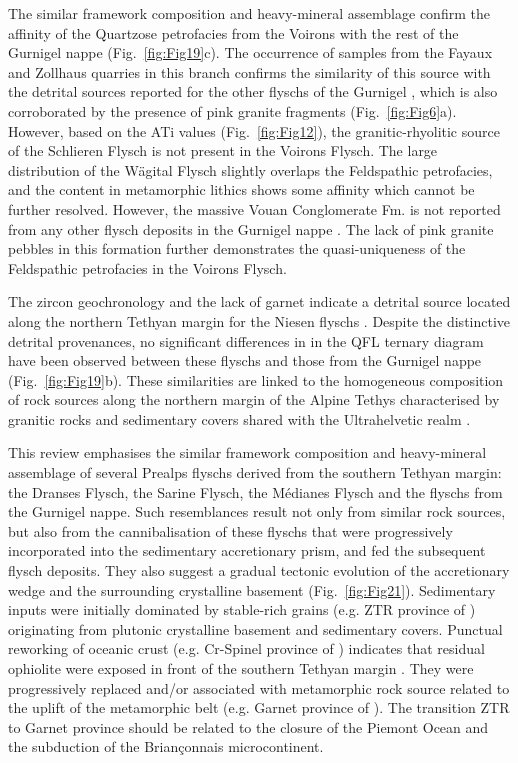 \documentclass[twoside]{article}
\begin{document}
The similar framework composition and heavy-mineral assemblage confirm the affinity of the Quartzose petrofacies from the Voirons with the rest of the Gurnigel nappe (Fig.~\ref{fig:Fig19}c). The occurrence of samples from the Fayaux and Zollhaus quarries in this branch confirms the similarity of this source with the detrital sources reported for the other flyschs of the Gurnigel \citep{Winkler1983,Winkler1984,Caron1989}, which is also corroborated by the presence of pink granite fragments (Fig.~\ref{fig:Fig6}a). However, based on the ATi values (Fig.~\ref{fig:Fig12}), the granitic-rhyolitic source of the Schlieren Flysch \citep{Butler2011} is not present in the Voirons Flysch. The large distribution of the Wägital Flysch slightly overlaps the Feldspathic petrofacies, and the content in metamorphic lithics shows some affinity which cannot be further resolved. However, the massive Vouan Conglomerate Fm. is not reported from any other flysch deposits in the Gurnigel nappe \citep{Caron1989}. The lack of pink granite pebbles in this formation further demonstrates the quasi-uniqueness of the Feldspathic petrofacies in the Voirons Flysch.\par
\medskip
The zircon geochronology \citep{Beltran-Trivino2013} and the lack of garnet \citep{Wildi1985,Bernoulli1990,Argnani2004} indicate a detrital source located along the northern Tethyan margin for the Niesen flyschs \citep{Wildi1985}. Despite the distinctive detrital provenances, no significant differences in in the QFL ternary diagram have been observed between these flyschs and those from the Gurnigel nappe (Fig.~\ref{fig:Fig19}b). These similarities are linked to the homogeneous composition of rock sources along the northern margin of the Alpine Tethys characterised by granitic rocks and sedimentary covers shared with the Ultrahelvetic realm \citep{Ackermann1986,Lihou1996b}.\par
\medskip
This review emphasises the similar framework composition and heavy-mineral assemblage of several Prealps flyschs derived from the southern Tethyan margin: the Dranses Flysch, the Sarine Flysch, the Médianes Flysch and the flyschs from the Gurnigel nappe. Such resemblances result not only from similar rock sources, but also from the cannibalisation of these flyschs that were progressively incorporated into the sedimentary accretionary prism, and fed the subsequent flysch deposits. They also suggest a gradual tectonic evolution of the accretionary wedge and the surrounding crystalline basement (Fig.~\ref{fig:Fig21}). Sedimentary inputs were initially dominated by stable-rich grains (e.g. ZTR province of \citealp{Wildi1985}) originating from plutonic crystalline basement and sedimentary covers. Punctual reworking of oceanic crust (e.g. Cr-Spinel province of \citealp{Wildi1985}) indicates that residual ophiolite were exposed in front of the southern Tethyan margin \citep{Gasinski1997}. They were progressively replaced and/or associated with metamorphic rock source related to the uplift of the metamorphic belt (e.g. Garnet province of \citealp{Wildi1985}). The transition ZTR to Garnet province should be related to the closure of the Piemont Ocean and the subduction of the Briançonnais microcontinent.\par
\end{document}
